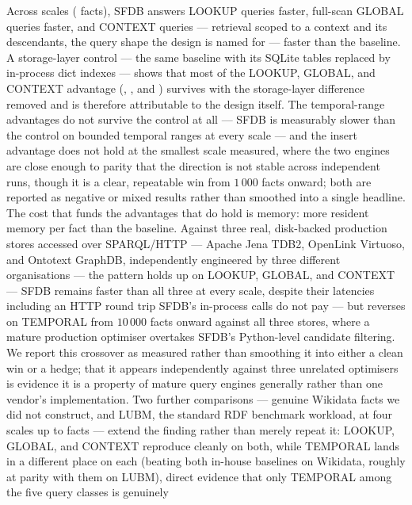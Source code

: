 Across \benchscalecount{} scales (\benchscales{} facts), SFDB answers
LOOKUP queries \rangelookupkg{} faster, full-scan GLOBAL queries
\rangeglobalkg{} faster, and CONTEXT queries --- retrieval scoped to a
context and its descendants, the query shape the design is named for ---
\rangecontextkg{} faster than the baseline. A storage-layer control --- the
same baseline with its SQLite tables replaced by in-process dict indexes
--- shows that most of the LOOKUP, GLOBAL, and CONTEXT advantage
(\rangelookupkgmem{}, \rangeglobalkgmem{}, and \rangecontextkgmem{})
survives with the storage-layer difference removed
and is therefore attributable to the design itself. The
temporal-range advantages do not survive the control at all --- SFDB is
measurably slower than the control on bounded temporal ranges at every
scale --- and the insert advantage does not hold at the smallest scale
measured, where the two engines are close enough to parity that the
direction is not stable across independent runs, though it is a clear,
repeatable win from $1\,000$ facts onward; both are reported
as negative or mixed results rather than smoothed into a single headline.
The cost that funds the advantages that do hold is
memory: \rangememkg{} more resident memory per fact than the baseline.
Against three real, disk-backed production stores accessed over
SPARQL/HTTP --- Apache Jena TDB2, OpenLink Virtuoso, and Ontotext
GraphDB, independently
engineered by three different organisations --- the pattern holds up on LOOKUP,
GLOBAL, and CONTEXT --- SFDB remains faster than all three at every scale, despite
their latencies including an HTTP round trip SFDB's in-process calls do
not pay --- but reverses on TEMPORAL from $10\,000$ facts
onward against all three stores, where a mature production optimiser
overtakes SFDB's Python-level candidate filtering. We report this
crossover as measured rather than smoothing it into either a clean win
or a hedge; that it appears independently against three unrelated
optimisers is evidence it is a property of mature query engines
generally rather than one vendor's implementation. Two further
comparisons --- \wikidatanumfacts{} genuine Wikidata facts we did not
construct, and LUBM, the standard RDF benchmark workload, at four scales
up to \lubmlargescale{} facts --- extend the finding rather than merely
repeat it: LOOKUP, GLOBAL, and CONTEXT reproduce cleanly on both, while
TEMPORAL lands in a different place on each (beating both in-house
baselines on Wikidata, roughly at parity with them on LUBM), direct
evidence that only TEMPORAL among the five query classes is genuinely
